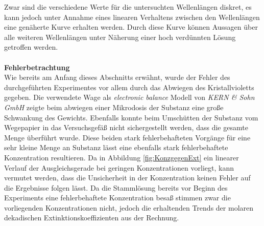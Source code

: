 Zwar sind die verschiedene Werte für die untersuchten Wellenlängen diskret, es kann jedoch unter Annahme eines linearen Verhaltens zwischen den Wellenlängen eine genäherte Kurve erhalten werden. Durch diese Kurve können Aussagen über alle weiteren Wellenlängen unter Näherung einer hoch verdünnten Lösung getroffen werden.\\
\\
\textbf{Fehlerbetrachtung}\\
Wie bereits am Anfang dieses Abschnitts erwähnt, wurde der Fehler des durchgeführten Experimentes vor allem durch das Abwiegen des Kristallvioletts gegeben. Die verwendete Wage als \textit{electronic balance} Modell von \textit{KERN \& Sohn GmbH} zeigte beim abwiegen einer Mikrodosis der Substanz eine große Schwankung des Gewichts. Ebenfalls konnte beim Umschütten der Substanz vom Wegepapier in das Versuchsgefäß nicht sichergestellt werden, dass die gesamte Menge überführt wurde. Diese beiden stark fehlerbehafteten Vorgänge für eine sehr kleine Menge an Substanz lässt eine ebenfalls stark fehlerbehaftete Konzentration resultieren. Da in Abbildung \ref{fig:KonzgegenExt} ein linearer Verlauf der Ausgleichsgerade bei geringen Konzentrationen vorliegt, kann vermutet werden, dass die Unsicherheit in der Konzentration keinen Fehler auf die Ergebnisse folgen lässt. Da die Stammlösung bereits vor Beginn des Experiments eine fehlerbehaftete Konzentration besaß stimmen zwar die vorliegenden Konzentrationen nicht, jedoch die erhaltenden Trends der molaren dekadischen Extinktionskoeffizienten aus der Rechnung. 